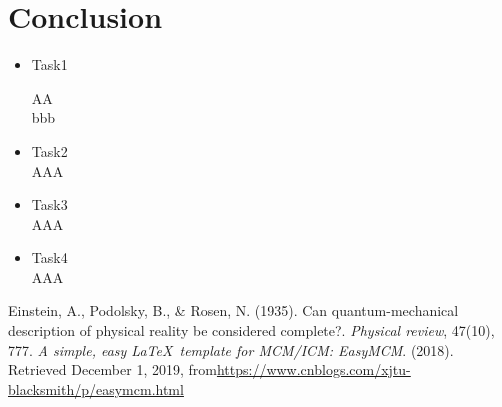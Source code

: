 \documentclass[12pt]{article}  %
\begin{document}
 	
 	

\section{Conclusion}
\begin{itemize}
	\item Task1
	
	 \qquad AA\\
	bbb
	
	\item Task2\\
	\qquad AAA
	\item Task3\\
	\qquad AAA
	
	\item Task4\\
	\qquad AAA
	
\end{itemize}


\begin{thebibliography}{99}
 Einstein, A., Podolsky, B., \& Rosen, N. (1935). Can quantum-mechanical description of physical reality be considered complete?. \emph{Physical review}, 47(10), 777.
 \emph{A simple, easy \LaTeX\ template for MCM/ICM: EasyMCM}. (2018). Retrieved December 1, 2019, from\url{https://www.cnblogs.com/xjtu-blacksmith/p/easymcm.html}
\end{thebibliography}
\end{document}
